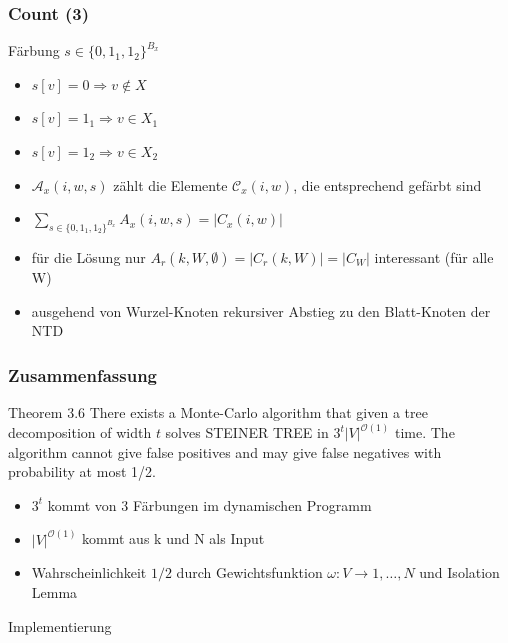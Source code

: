 \documentclass{beamer}
\begin{document}
\begin{frame}
\frametitle{Count (3)}
Färbung $s \in \{0,1_1,1_2 \}^{B_x}$
\begin{itemize}
\item $s[v] = 0 \Rightarrow v \notin X$
\item $s[v] = 1_1 \Rightarrow v \in X_1$ 
\item $s[v] = 1_2 \Rightarrow v \in X_2$ 
\item $\mathcal{A}_x(i,w,s)$ zählt die Elemente $\mathcal{C}_x(i,w)$, die entsprechend gefärbt sind
\item $\sum\limits_{s \in  \{ 0,1_1,1_2 \}^{B_x} } A_x(i,w,s) = |C_x(i,w)|$
\item für die Lösung nur $A_r(k,W,\emptyset) = |C_r(k,W)| = |C_W|$ interessant (für alle W)
\item ausgehend von Wurzel-Knoten rekursiver Abstieg zu den Blatt-Knoten der NTD
\end{itemize}
\end{frame}
\begin{frame}
\frametitle{Zusammenfassung}
\begin{block}{Theorem 3.6}
There exists a Monte-Carlo algorithm that given a tree decomposition of width $t$ solves STEINER TREE in $3^t|V|^{\mathcal{O}(1)}$ time. The algorithm cannot give false positives and may give false negatives with probability at most 1/2.
\end{block}
\begin{itemize}
\item $3^t$ kommt von 3 Färbungen im dynamischen Programm
\item $|V|^{\mathcal{O}(1)}$ kommt aus k und N als Input
\item Wahrscheinlichkeit $1/2$ durch Gewichtsfunktion $\omega:V\rightarrow {1,\dots,N}$ und Isolation Lemma
\end{itemize}
\end{frame}


\begin{frame}
\Huge{\centerline{Implementierung}}
\end{frame}
\end{document}
